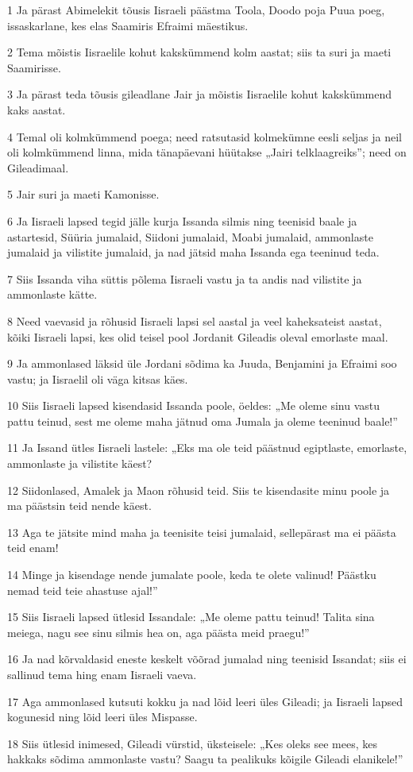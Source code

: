 \par 1 Ja pärast Abimelekit tõusis Iisraeli päästma Toola, Doodo poja Puua poeg, issaskarlane, kes elas Saamiris Efraimi mäestikus.
\par 2 Tema mõistis Iisraelile kohut kakskümmend kolm aastat; siis ta suri ja maeti Saamirisse.
\par 3 Ja pärast teda tõusis gileadlane Jair ja mõistis Iisraelile kohut kakskümmend kaks aastat.
\par 4 Temal oli kolmkümmend poega; need ratsutasid kolmekümne eesli seljas ja neil oli kolmkümmend linna, mida tänapäevani hüütakse „Jairi telklaagreiks”; need on Gileadimaal.
\par 5 Jair suri ja maeti Kamonisse.
\par 6 Ja Iisraeli lapsed tegid jälle kurja Issanda silmis ning teenisid baale ja astartesid, Süüria jumalaid, Siidoni jumalaid, Moabi jumalaid, ammonlaste jumalaid ja vilistite jumalaid, ja nad jätsid maha Issanda ega teeninud teda.
\par 7 Siis Issanda viha süttis põlema Iisraeli vastu ja ta andis nad vilistite ja ammonlaste kätte.
\par 8 Need vaevasid ja rõhusid Iisraeli lapsi sel aastal ja veel kaheksateist aastat, kõiki Iisraeli lapsi, kes olid teisel pool Jordanit Gileadis oleval emorlaste maal.
\par 9 Ja ammonlased läksid üle Jordani sõdima ka Juuda, Benjamini ja Efraimi soo vastu; ja Iisraelil oli väga kitsas käes.
\par 10 Siis Iisraeli lapsed kisendasid Issanda poole, öeldes: „Me oleme sinu vastu pattu teinud, sest me oleme maha jätnud oma Jumala ja oleme teeninud baale!”
\par 11 Ja Issand ütles Iisraeli lastele: „Eks ma ole teid päästnud egiptlaste, emorlaste, ammonlaste ja vilistite käest?
\par 12 Siidonlased, Amalek ja Maon rõhusid teid. Siis te kisendasite minu poole ja ma päästsin teid nende käest.
\par 13 Aga te jätsite mind maha ja teenisite teisi jumalaid, sellepärast ma ei päästa teid enam!
\par 14 Minge ja kisendage nende jumalate poole, keda te olete valinud! Päästku nemad teid teie ahastuse ajal!”
\par 15 Siis Iisraeli lapsed ütlesid Issandale: „Me oleme pattu teinud! Talita sina meiega, nagu see sinu silmis hea on, aga päästa meid praegu!”
\par 16 Ja nad kõrvaldasid eneste keskelt võõrad jumalad ning teenisid Issandat; siis ei sallinud tema hing enam Iisraeli vaeva.
\par 17 Aga ammonlased kutsuti kokku ja nad lõid leeri üles Gileadi; ja Iisraeli lapsed kogunesid ning lõid leeri üles Mispasse.
\par 18 Siis ütlesid inimesed, Gileadi vürstid, üksteisele: „Kes oleks see mees, kes hakkaks sõdima ammonlaste vastu? Saagu ta pealikuks kõigile Gileadi elanikele!”

